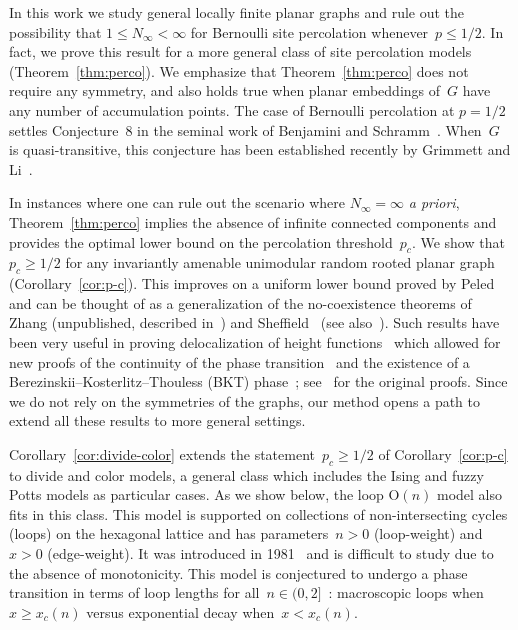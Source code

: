 \documentclass[11pt,letterpaper]{amsart}
\newcounter{n}
\numberwithin{n}{section}
\theoremstyle{plain}
\theoremstyle{definition}
\theoremstyle{remark}
\renewcommand\O[1]{\(\mathrm{O}(#1)\)}
\newcommand{\1}{\mathbbm{1}}
\begin{document}
In this work we study general locally finite planar graphs and rule out the possibility that $1 \leq N_\infty < \infty$ for  Bernoulli site percolation whenever~$p \leq 1/2$. In fact, we prove this result for a more general class of site percolation models (Theorem~\ref{thm:perco}).
We emphasize that Theorem~\ref{thm:perco} does not require any symmetry, and also holds true when planar embeddings of~$G$ have any number of accumulation points. 
The case of Bernoulli percolation at $p=1/2$ settles Conjecture~$8$ in the seminal work of Benjamini and Schramm~\cite{BenSch96}. When~$G$ is quasi-transitive, this conjecture has been established recently by Grimmett and Li~\cite{GriLi25}.

In instances where one can rule out the scenario where $N_{\infty} = \infty$ {\em a priori}, Theorem~\ref{thm:perco} implies the absence of infinite connected components and provides the optimal lower bound on the percolation threshold~$p_c$.  We show that~$p_c\geq 1/2$ for any invariantly amenable unimodular random rooted planar graph (Corollary~\ref{cor:p-c}).
This improves on a uniform lower bound proved by Peled~\cite{Pel20} and can be thought of as a generalization of the no-coexistence theorems of Zhang (unpublished, described in~\cite[Lemma~9.12]{Gri99a}) and Sheffield~\cite{She05} (see also~\cite{DumRaoTas19}).
Such results have been very useful in proving delocalization of height functions~\cite{ChaPelSheTas21,Lam19,GlaMan21} which allowed for new proofs of the continuity of the phase transition~\cite{GlaLam25} and the existence of a Berezinskii–Kosterlitz–Thouless (BKT) phase~\cite{LisEng23,AizHarPelSha21}; see~\cite{FroSpe81,DumSidTas17} for the original proofs. 
Since we do not rely on the symmetries of the graphs, our method opens a path to extend all these results to more general settings.


Corollary~\ref{cor:divide-color} extends the statement~$p_c\geq 1/2$ of Corollary~\ref{cor:p-c} to divide and color models, a general class which includes the Ising and fuzzy Potts models as particular cases. As we show below, the loop \O{n} model also fits in this class.
This model is supported on collections of non-intersecting cycles (loops) on the hexagonal lattice and has parameters~$n>0$ (loop-weight) and~$x>0$ (edge-weight). 
It was introduced in 1981~\cite{DomMukNie81} and is difficult to study due to the absence of monotonicity. This model is conjectured to undergo a phase transition in terms of loop lengths for all~$n\in (0,2]$~\cite{Nie82}: macroscopic loops when~$x\geq x_c(n)$ versus exponential decay when~$x< x_c(n)$.
\end{document}
